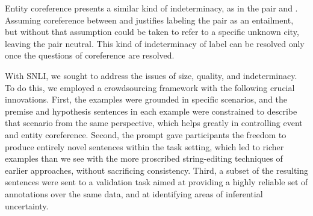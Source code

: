 Entity coreference presents a similar kind of indeterminacy, as in the pair  and . Assuming coreference between  and  justifies labeling the pair as an entailment, but without that assumption  could be taken to refer to a specific unknown city, leaving the pair neutral. This kind of indeterminacy of label can be resolved only once the questions of coreference are resolved.

With SNLI, we sought to address the issues of size, quality, and
indeterminacy. To do this, we employed a crowdsourcing framework with
the following crucial innovations. First, the examples were grounded
in specific scenarios, and the premise and hypothesis sentences in each example 
were constrained to describe that scenario from the same perspective, 
which helps greatly in controlling event and entity coreference. Second, the prompt
gave participants the freedom to produce entirely novel sentences
within the task setting, which led to richer examples than we see with
the more proscribed string-editing techniques of earlier approaches,
without sacrificing consistency. Third, a subset of the resulting
sentences were sent to a validation task aimed at providing a highly 
reliable set of annotations over the same data, and at identifying areas of inferential uncertainty.






